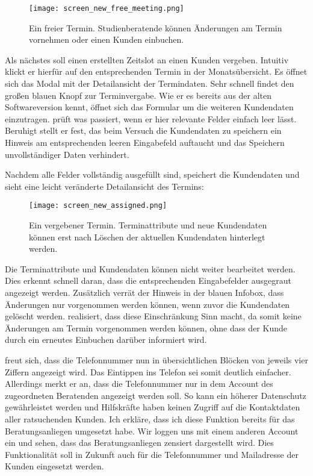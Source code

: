 \begin{figure}[H]
    \caption{Ein freier Termin. Studienberatende können Änderungen am Termin vornehmen oder einen Kunden einbuchen.}
    \centering
    \texttt{[image: screen\_new\_free\_meeting.png]}
\end{figure}

Als nächstes soll \ipName einen erstellten Zeitslot an einen Kunden vergeben.
Intuitiv klickt er hierfür auf den entsprechenden Termin in der
Monatsübersicht. Es öffnet sich das Modal mit der Detailansicht der
Termindaten. Sehr schnell findet \ipName den großen blauen Knopf zur
Terminvergabe. Wie er es bereits aus der alten Softwareversion kennt, öffnet
sich das Formular um die weiteren Kundendaten einzutragen. \ipName prüft was
passiert, wenn er hier relevante Felder einfach leer lässt. Beruhigt stellt er
fest, das beim Versuch die Kundendaten zu speichern ein Hinweis am
entsprechenden leeren Eingabefeld auftaucht und das Speichern unvollständiger
Daten verhindert.

Nachdem alle Felder vollständig ausgefüllt sind, speichert \ipName die
Kundendaten und sieht eine leicht veränderte Detailansicht des Termins:

\begin{figure}[H]
    \caption{Ein vergebener Termin. Terminattribute und neue Kundendaten können erst nach Löschen der aktuellen Kundendaten hinterlegt werden.}
    \centering
    \texttt{[image: screen\_new\_assigned.png]}
\end{figure}

Die Terminattribute und Kundendaten können nicht weiter bearbeitet werden. Dies
erkennt \ipName schnell daran, dass die entsprechenden Eingabefelder ausgegraut
angezeigt werden. Zusätzlich verrät der Hinweis in der blauen Infobox, dass
Änderungen nur vorgenommen werden können, wenn zuvor die Kundendaten gelöscht
werden. \ipName realisiert, dass diese Einschränkung Sinn macht, da somit keine
Änderungen am Termin vorgenommen werden können, ohne dass der Kunde durch ein
erneutes Einbuchen darüber informiert wird.

\ipName freut sich, dass die Telefonnummer nun in übersichtlichen Blöcken von jeweils vier Ziffern angezeigt wird. Das Eintippen ins Telefon sei somit deutlich einfacher. Allerdings merkt er an, dass die Telefonnummer nur in dem Account des zugeordneten Beratenden angezeigt werden soll. So kann ein höherer Datenschutz gewährleistet werden und Hilfskräfte haben keinen Zugriff auf die Kontaktdaten aller ratsuchenden Kunden. Ich erkläre, dass ich diese Funktion bereits für das Beratungsanliegen umgesetzt habe. Wir loggen uns mit einem anderen Account ein und sehen, dass das Beratungsanliegen zensiert dargestellt wird. Dies Funktionalität soll in Zukunft auch für die Telefonnummer und Mailadresse der Kunden eingesetzt werden.

